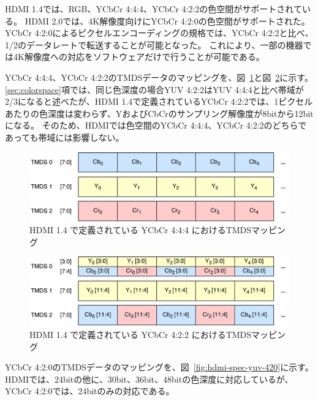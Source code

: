 HDMI 1.4\cite{hdmi-spec-1-4}では、RGB、YCbCr 4:4:4、YCbCr 4:2:2の色空間がサポートされている。
HDMI 2.0\cite{hdmi-spec-2-0}では、4K解像度向けにYCbCr 4:2:0の色空間がサポートされた。
YCbCr 4:2:0によるピクセルエンコーディングの規格では、YCbCr 4:2:2と比べ、1/2のデータレートで転送することが可能となった。
これにより、一部の機器では4K解像度への対応をソフトウェアだけで行うことが可能である。

YCbCr 4:4:4、YCbCr 4:2:2のTMDSデータのマッピングを、図~\ref{fig:hdmi-spec-yuv-444}と図~\ref{fig:hdmi-spec-yuv-422}に示す。
\ref{sec:colorspace}項では、同じ色深度の場合YUV 4:2:2はYUV 4:4:4と比べ帯域が2/3になると述べたが、HDMI 1.4で定義されているYCbCr 4:2:2では、1ピクセルあたりの色深度は変わらず、YおよびCbCrのサンプリング解像度が8bitから12bitになる。
そのため、HDMIでは色空間のYCbCr 4:4:4、YCbCr 4:2:2のどちらであっても帯域には影響しない。

\begin{figure}[htbp]
  \begin{center}
    \includegraphics[bb=0 0 531 141,width=13.926cm]{img/hdmi-spec-yuv-444.pdf}
  \end{center}
  \caption{HDMI 1.4 で定義されている YCbCr 4:4:4 におけるTMDSマッピング}
  \label{fig:hdmi-spec-yuv-444}
\end{figure}

\begin{figure}[htbp]
  \begin{center}
    \includegraphics[bb=0 0 531 141,width=13.926cm]{img/hdmi-spec-yuv-422.pdf}
  \end{center}
  \caption{HDMI 1.4 で定義されている YCbCr 4:2:2 におけるTMDSマッピング}
  \label{fig:hdmi-spec-yuv-422}
\end{figure}

YCbCr 4:2:0のTMDSデータのマッピングを、図~\ref{fig:hdmi-spec-yuv-420}に示す。
HDMIでは、24bitの他に、30bit、36bit、48bitの色深度に対応しているが、YCbCr 4:2:0では、24bitのみの対応である。

